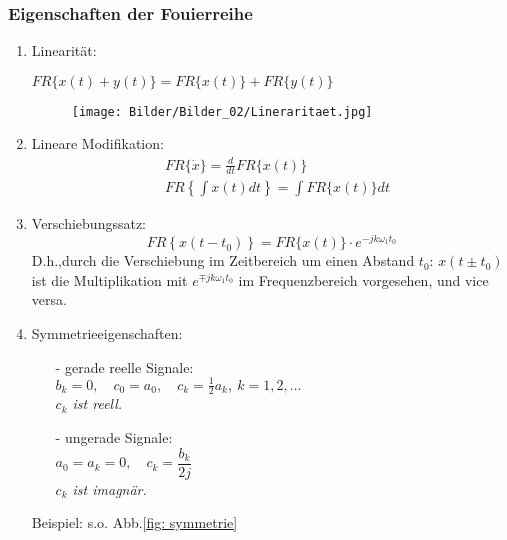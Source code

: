 \subsubsection{Eigenschaften der Fouierreihe}
\begin{enumerate}[label={(\arabic*)}]
    \item 
    Linearität:\\
    \begin{center}
            $\textit{FR}\{x(t)+y(t)\}=\textit{FR}\{x(t)\}+\textit{FR}\{y(t)\}$\\
    \end{center}
    \begin{figure}[H]
        \centering
        \texttt{[image: Bilder/Bilder\_02/Lineraritaet.jpg]}
    \end{figure}
    \item
    Lineare Modifikation:\\
    \begin{equation}
    \begin{aligned}
        &\textit{FR} \{\dot{x}\}=\frac{d}{d t} \textit{FR}\{x(t)\}\\
        &\textit{FR}\left\{\int x(t) d t\right\}=\int \textit{FR}\{x(t)\} d t
    \end{aligned}
    \nonumber
    \end{equation}
    \item
    Verschiebungssatz:\\
    \begin{equation}
        \textit{FR}\left\{x\left(t-t_{0}\right)\right\}=\textit{FR}\{x(t)\} \cdot e^{-j k \omega_{1}t_0}
    \end{equation}
    \nonumber
    D.h.,durch die Verschiebung im Zeitbereich um einen Abstand $t_0$: $x(t\pm t_0)$ ist die Multiplikation mit $e^{\mp j k \omega_{1}t_0}$ im Frequenzbereich vorgesehen, und vice versa.
    \item
    Symmetrieeigenschaften:
        \begin{itemize}
            \item [-]
            gerade reelle Signale:\\
            $b_k=0, \quad c_0=a_0, \quad c_k=\frac{1}{2}a_k, \: k=1,2,\ldots$\\
            \textit{$c_k$ ist reell.}
            \item [-]
            ungerade Signale:\\
            $a_0=a_k=0, \quad c_k=\dfrac{b_k}{2j}$\\
            \textit{$c_k$ ist imagnär.}
        \end{itemize}
    Beispiel: s.o. Abb.\ref{fig: symmetrie}
\end{enumerate}

